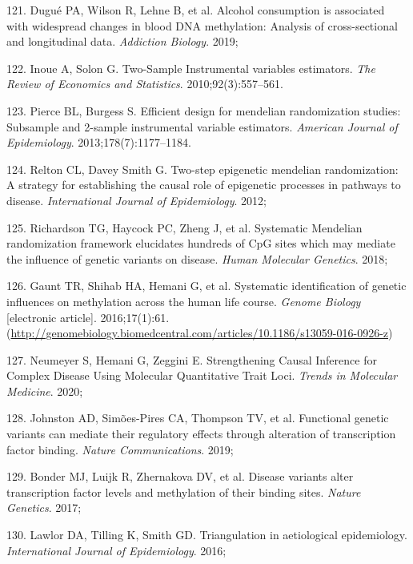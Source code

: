 \documentclass[11pt,oneside]{bristolthesis}
\newenvironment{cslreferences}%
  {}%
  {\par}
\begin{document}
\begin{cslreferences}
\leavevmode\hypertarget{ref-Dugue2019}{}%
121. Dugué PA, Wilson R, Lehne B, et al. Alcohol consumption is associated with widespread changes in blood DNA methylation: Analysis of cross-sectional and longitudinal data. \emph{Addiction Biology}. 2019;

\leavevmode\hypertarget{ref-Inoue2010}{}%
122. Inoue A, Solon G. Two-Sample Instrumental variables estimators. \emph{The Review of Economics and Statistics}. 2010;92(3):557--561.

\leavevmode\hypertarget{ref-Pierce2013}{}%
123. Pierce BL, Burgess S. Efficient design for mendelian randomization studies: Subsample and 2-sample instrumental variable estimators. \emph{American Journal of Epidemiology}. 2013;178(7):1177--1184.

\leavevmode\hypertarget{ref-Relton2012}{}%
124. Relton CL, Davey Smith G. Two-step epigenetic mendelian randomization: A strategy for establishing the causal role of epigenetic processes in pathways to disease. \emph{International Journal of Epidemiology}. 2012;

\leavevmode\hypertarget{ref-Richardson2018}{}%
125. Richardson TG, Haycock PC, Zheng J, et al. Systematic Mendelian randomization framework elucidates hundreds of CpG sites which may mediate the influence of genetic variants on disease. \emph{Human Molecular Genetics}. 2018;

\leavevmode\hypertarget{ref-Gaunt2016}{}%
126. Gaunt TR, Shihab HA, Hemani G, et al. Systematic identification of genetic influences on methylation across the human life course. \emph{Genome Biology} {[}electronic article{]}. 2016;17(1):61. (\url{http://genomebiology.biomedcentral.com/articles/10.1186/s13059-016-0926-z})

\leavevmode\hypertarget{ref-Neumeyer2020}{}%
127. Neumeyer S, Hemani G, Zeggini E. Strengthening Causal Inference for Complex Disease Using Molecular Quantitative Trait Loci. \emph{Trends in Molecular Medicine}. 2020;

\leavevmode\hypertarget{ref-Johnston2019}{}%
128. Johnston AD, Simões-Pires CA, Thompson TV, et al. Functional genetic variants can mediate their regulatory effects through alteration of transcription factor binding. \emph{Nature Communications}. 2019;

\leavevmode\hypertarget{ref-Bonder2017}{}%
129. Bonder MJ, Luijk R, Zhernakova DV, et al. Disease variants alter transcription factor levels and methylation of their binding sites. \emph{Nature Genetics}. 2017;

\leavevmode\hypertarget{ref-Lawlor2016}{}%
130. Lawlor DA, Tilling K, Smith GD. Triangulation in aetiological epidemiology. \emph{International Journal of Epidemiology}. 2016;


\end{cslreferences}
\end{document}
